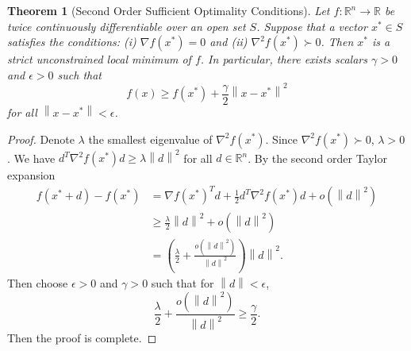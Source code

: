 \documentclass[12pt,a4paper]{article}
\numberwithin{equation}{section}
\theoremstyle{mystyle}
\newtheorem{theorem}[definition]{Theorem}
\newcommand{\R}{\mathbb{R}}
\newcommand{\grad}{\nabla}
\newcommand{\norm}[1]{\left\lVert #1 \right\rVert}
\begin{document}
	\begin{theorem}[Second Order Sufficient Optimality Conditions]
		Let $f:\R^n \to \R$ be twice continuously differentiable over an open set $S$. Suppose that a vector $x^*\in S$ satisfies the conditions: (i) $\grad f(x^*)=0$ and (ii) $\grad^2 f(x^*)\succ 0$. Then $x^*$ is a strict unconstrained local minimum of $f$. In particular, there exists scalars $\gamma>0$ and $\epsilon>0$ such that
		$$
		f(x)\geq f(x^*)+\frac{\gamma}{2}\norm{x-x^*}^2
		$$
		for all $\norm{x-x^*}<\epsilon$.
	\end{theorem}
	\begin{proof}
		Denote $\lambda$ the smallest eigenvalue of $\grad^2 f(x^*)$. Since $\grad^2 f(x^*)\succ 0$, $\lambda >0$. We have $d^T \grad^2 f(x^*)d \geq \lambda \norm{d}^2$ for all $d\in \R^n$. By the second order Taylor expansion
		\begin{align*}
			f(x^*+d)-f(x^*)&=\grad f(x^*)^T d + \frac{1}{2} d^T \grad^2 f(x^*)d+o(\norm{d}^2)\\
			&\geq \frac{\lambda}{2}\norm{d}^2+o(\norm{d}^2)\\
			&=\left(\frac{\lambda}{2}+\frac{o(\norm{d}^2)}{\norm{d}^2}\right)\norm{d}^2.
		\end{align*}
		Then choose $\epsilon>0$ and $\gamma>0$ such that for $\norm{d}<\epsilon$,
		$$
		\frac{\lambda}{2}+\frac{o(\norm{d}^2)}{\norm{d}^2}\geq \frac{\gamma}{2}.
		$$
		Then the proof is complete.
	\end{proof}
	\appendix
	
	 
\end{document}

